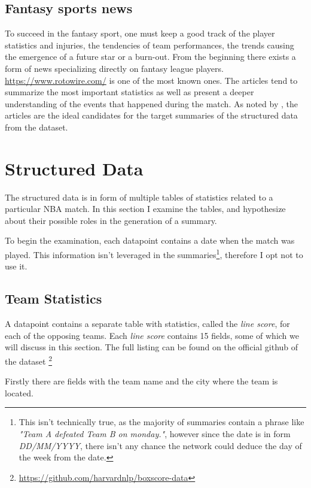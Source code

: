 \subsection{Fantasy sports news}

To succeed in the fantasy sport, one must keep a good track of the player statistics and injuries, the tendencies of team performances, the trends causing the emergence of a future star or a burn-out. From the beginning there exists a form of news specializing directly on fantasy league players. \url{https://www.rotowire.com/} is one of the most known ones. The articles tend to summarize the most important statistics as well as present a deeper understanding of the events that happened during the match. As noted by \citep{wiseman2017}, the articles are the ideal candidates for the target summaries of the structured data from the dataset.

\section{Structured Data} \label{structured_data_rotowire}

The structured data is in form of multiple tables of statistics related to a particular NBA match. In this section I examine the tables, and hypothesize about their possible roles in the generation of a summary.

To begin the examination, each datapoint contains a date when the match was played. This information isn't leveraged in the summaries\footnote{This isn't technically true, as the majority of summaries contain a phrase like \emph{"Team A defeated Team B on monday."}, however since the date is in form \emph{DD/MM/YYYY}, there isn't any chance the network could deduce the day of the week from the date.}, therefore I opt not to use it.

\subsection{Team Statistics}

A datapoint contains a separate table with statistics, called the \emph{line score}, for each of the opposing teams. Each \emph{line score} contains 15 fields, some of which we will discuss in this section. The full listing can be found on the official github of the dataset \footnote{\label{note1}\url{https://github.com/harvardnlp/boxscore-data}}

Firstly there are fields with the team name and the city where the team is located.

